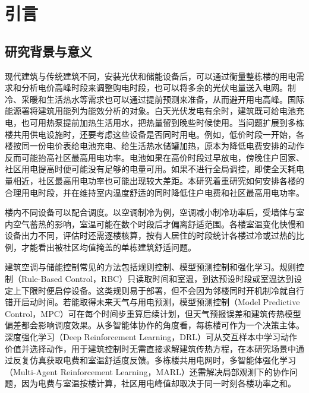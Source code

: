 \chapter{引言}
\section{研究背景与意义}
现代建筑与传统建筑不同，安装光伏和储能设备后，可以通过衡量整栋楼的用电需求和分析电价高峰时段来调整购电时段，也可以将多余的光伏电量送入电网。制冷、采暖和生活热水等需求也可以通过提前预测来准备，从而避开用电高峰。国际能源署将建筑用能列为能效分析的对象\cite{iea2023}。白天光伏发电有余时，建筑既可给电池充电，也可用热泵提前加热生活用水，把热量留到晚些时候使用。当问题扩展到多栋楼共用供电设施时，还要考虑这些设备是否同时用电\cite{citylearn2024}。例如，低价时段一开始，各楼按同一份电价表给电池充电、给生活热水储罐加热，原本为降低电费安排的动作反而可能抬高社区最高用电功率。电池如果在高价时段过早放电，傍晚住户回家、社区用电提高时便可能没有足够的电量可用。如果不进行全局调控，即使全天耗电量相近，社区最高用电功率也可能出现较大差距。本研究着重研究如何安排各楼的合理用电时段，并在维持室内温度舒适的同时降低住户电费和社区最高用电功率。

 楼内不同设备可以配合调度\cite{charbonnier2022}。以空调制冷为例，空调减小制冷功率后，受墙体与室内空气蓄热的影响，室温可能在数个时段后才偏离舒适范围。各楼室温变化快慢和设备出力不同，评估时还需逐楼核算，按有人居住的时段统计各楼过冷或过热的比例，才能看出被社区均值掩盖的单栋建筑舒适问题。

建筑空调与储能控制常见的方法包括规则控制、模型预测控制和强化学习。规则控制（Rule-Based Control，RBC）只读取时间和室温，到达预设时段或室温达到设定上下限时便启停设备。这类规则易于部署，但不会因为邻楼同时开机制冷就自行错开启动时间。若能取得未来天气与用电预测，模型预测控制（Model Predictive Control，MPC）可在每个时间步重算后续计划\cite{mps2018}，但天气预报误差和建筑传热模型偏差都会影响调度效果\cite{drgona2020mpc}。从多智能体协作的角度看，每栋楼可作为一个决策主体\cite{albrecht2024marl}。深度强化学习（Deep Reinforcement Learning，DRL）可从交互样本中学习动作价值并选择动作\cite{mnih2015}，用于建筑控制时无需直接求解建筑传热方程，在本研究场景中通过反复仿真获取电费和室温舒适度反馈。多栋楼共用电网时，多智能体强化学习（Multi-Agent Reinforcement Learning，MARL）还需解决局部观测下的协作问题\cite{marl2021}，因为电费与室温按楼计算，社区用电峰值却取决于同一时刻各楼功率之和。

